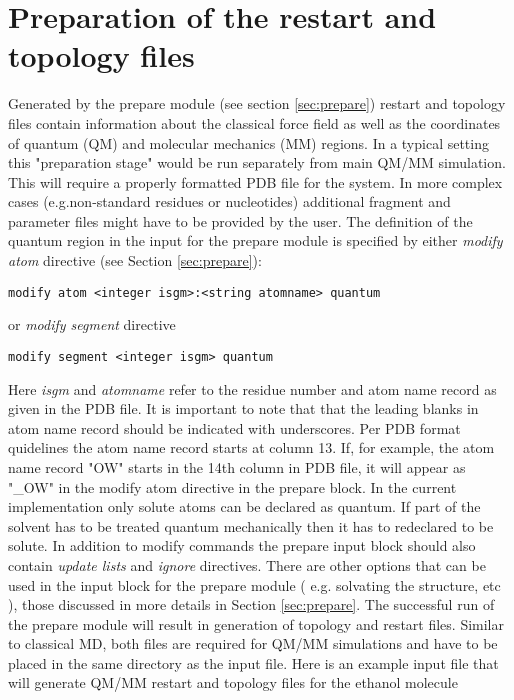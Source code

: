 \section{Preparation of the restart and topology files}

Generated by the prepare
module (see section \ref{sec:prepare}) restart and topology files contain
information about the classical force field as well as the
coordinates of quantum (QM) and molecular
mechanics (MM) regions. 
In a typical setting this "preparation stage" 
would be run separately from main QM/MM simulation. This will require a 
properly formatted
PDB file for the system. In more complex cases (e.g.non-standard residues or nucleotides) additional fragment and parameter
files might have to be provided by the user. The definition of the quantum region
in the input for the prepare module is specified by either {\it modify atom} directive (see Section \ref{sec:prepare}):

\begin{verbatim}
modify atom <integer isgm>:<string atomname> quantum
\end{verbatim}

or {\it modify segment} directive

\begin{verbatim}
modify segment <integer isgm> quantum
\end{verbatim}

Here {\it isgm} and {\it atomname} refer to the residue number and atom name record 
as given in the PDB file.
It is important to note that  
that the leading blanks 
in atom name record should be indicated with underscores.
Per PDB format quidelines the atom name record starts at column 13. If, for example, 
the atom name record "OW" starts 
in the 14th column in PDB file, it will appear 
as "\_OW" in the modify atom directive in the prepare block. In the current implementation
only solute atoms can be declared as quantum. If part of the solvent has to be treated quantum mechanically
then it has to redeclared to be solute.
In addition to modify commands the prepare input block should 
also contain {\it update lists} and {\it ignore} directives. There are other options
that can be used in the input block for the prepare module ( e.g. solvating the structure, etc ),
 those discussed 
in more details in Section \ref{sec:prepare}.
The successful run of the prepare module will result in generation of
topology and restart files. Similar to classical MD, both files are required for QM/MM simulations 
and have to be placed in the same directory
as the input file. Here is an example input file that will generate QM/MM restart and topology files for the ethanol molecule

